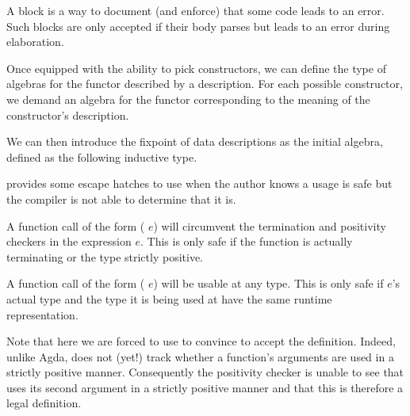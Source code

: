 \noindent
\begin{minipage}[t]{0.35\textwidth}
\end{minipage}\hfill
\begin{minipage}[t]{0.42\textwidth}
\end{minipage}

\begin{remark}
  A  block is a way to document (and
  enforce) that some code leads to an error.
  Such blocks are only accepted if their body parses but
  leads to an error during elaboration.
\end{remark}

Once equipped with the ability to pick constructors, we can define
the type of algebras for the functor described by a 
description. For each possible constructor, we demand an algebra for
the functor corresponding to the meaning of the  constructor's description.


We can then introduce the fixpoint of data descriptions as the initial
algebra, defined as the following inductive type.


\begin{remark}
  \idris provides some escape hatches to use when the author
  knows a usage is safe but the compiler is not able to
  determine that it is.

  A function call of the form (\assertTotal{} $e$) will
  circumvent the termination and positivity checkers in
  the expression $e$.
  This is only safe if the function is actually terminating
  or the type strictly positive.

  A function call of the form (\believeMe{} $e$) will be
  usable at any type. This is only safe if $e$'s actual type
  and the type it is being used at have the same runtime
  representation.
\end{remark}

Note that here we are forced to use \assertTotal{} to convince \idris{}
to accept the definition.
%
Indeed, unlike Agda, \idris{} does not (yet!) track whether a function's
arguments are used in a strictly positive manner.
%
Consequently the positivity checker
is unable to see that  uses its second
argument in a strictly positive manner
and that this is therefore a legal definition.


